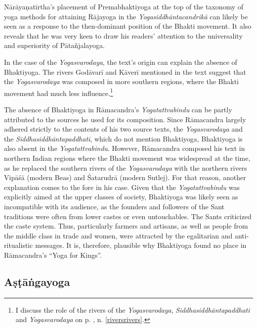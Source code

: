 Nārāyaṇatīrtha's placement of Premabhaktiyoga at the top of the taxonomy of yoga methods for attaining Rājayoga in the \emph{Yogasiddhāntacandrikā} can likely be seen as a response to the then-dominant position of the Bhakti movement. It also reveals that he was very keen to draw his readers' attention to the universality and superiority of Pātañjalayoga.

In the case of the \emph{Yogasvarodaya}, the text's origin can explain the absence of Bhaktiyoga. The rivers Godāvarī and Kāverī mentioned in the text suggest that the \emph{Yogasvarodaya} was composed in more southern regions, where the Bhakti movement had much less influence.\footnote{I discuss the role of the rivers of the \emph{Yogasvarodaya}, \emph{Siddhasiddhāntapaddhati} and \emph{Yogasvarodaya} on p. \pageref{riversrivers}, n. \ref{riversrivers}.}

The absence of Bhaktiyoga in Rāmacandra's \emph{Yogatattvabindu} can be partly attributed to the sources he used for its composition. Since Rāmacandra largely adhered strictly to the contents of his two source texts, the \emph{Yogasvarodaya} and the \emph{Siddhasiddhāntapaddhati}, which do not mention Bhaktiyoga, Bhaktiyoga is also absent in the \emph{Yogatattvabindu}. However, Rāmacandra composed his text in northern Indian regions where the Bhakti movement was widespread at the time, as he replaced the southern rivers of the \emph{Yogasvarodaya} with the northern rivers Vipāśā (modern Beas) and Śatarudrā (modern Sutlej). For that reason, another explanation comes to the fore in his case. Given that the \emph{Yogatattvabindu} was explicitly aimed at the upper classes of society, Bhaktiyoga was likely seen as incompatible with its audience, as the founders and followers of the Sant traditions were often from lower castes or even untouchables. The Sants criticized the caste system. Thus, particularly farmers and artisans, as well as people from the middle class in trade and women, were attracted by the egalitarian and anti-ritualistic messages.  It is, therefore, plausible why Bhaktiyoga found no place in Rāmacandra's ``Yoga for Kings''. 

\subsection{Aṣṭāṅgayoga}
\label{ashtangayogacomplex}

